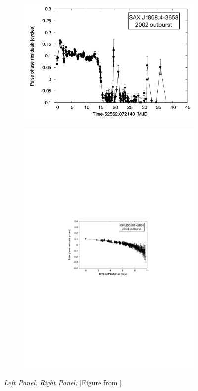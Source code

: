 \documentclass[graybox]{svmult}
\begin{document}
\begin{figure}
\begin{subfigure}{.5\textwidth}
  \centering
  \includegraphics[width=.8\linewidth]{REVIEW_AMXP/1808_phases}
  \label{fig:sfig1}
\end{subfigure}%
\begin{subfigure}{.5\textwidth}
  \centering
  \includegraphics[angle=-90,width=1.1\linewidth]{REVIEW_AMXP/00291_phases_2}
  \label{fig:sfig2}
\end{subfigure}
\caption{\textit{Left Panel:} \textit{Right Panel:} [Figure from \cite{Bult2019c}]}
\label{fig:tim_noise}
\end{figure}
\end{document}
